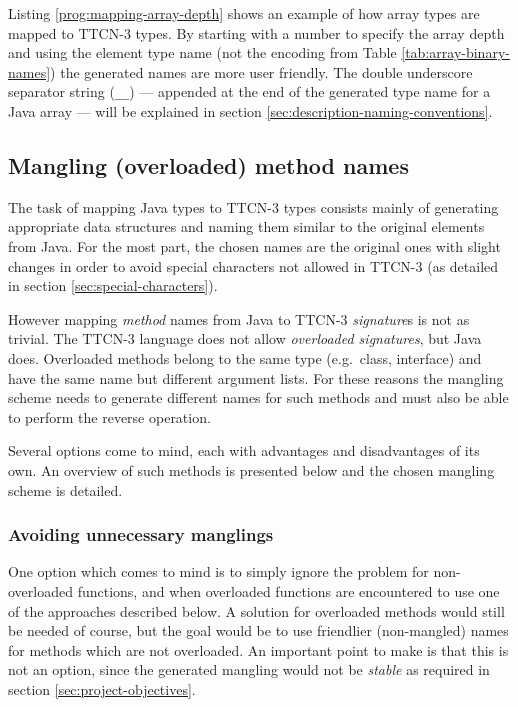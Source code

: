 Listing \ref{prog:mapping-array-depth} shows an example of how
array types are mapped to \ac{TTCN-3} types.
By starting with a number to specify the array depth
and using the element type name
(not the encoding from Table \ref{tab:array-binary-names})
the generated names are more user friendly.
The double underscore separator string (\verb=__=) ---
appended at the end of the generated type name for a Java array ---
will be explained in section \ref{sec:description-naming-conventions}.

\begin{program}
\caption{Mapping of the \texttt{String[][]} Java Array type%
	\label{prog:mapping-array-depth}}
\end{program}


\subsection{Mangling (overloaded) method names}

The task of mapping Java types to \ac{TTCN-3} types
consists mainly of generating appropriate data structures
and naming them similar to the original elements from Java.
For the most part, the chosen names are the original ones
with slight changes in order to avoid special characters
not allowed in \ac{TTCN-3}
(as detailed in section \ref{sec:special-characters}).

However mapping \emph{method} names from Java to
\ac{TTCN-3} \emph{signature}s is not as trivial.
The \ac{TTCN-3} language does not allow \emph{overloaded signatures},
but Java does.
Overloaded methods belong to the same type (e.g.\ class, interface)
and have the same name but different argument lists.
For these reasons the mangling scheme
needs to generate different names for such methods
and must also be able to perform the reverse operation.

Several options come to mind,
each with advantages and disadvantages of its own.
An overview of such methods is presented below
and the chosen mangling scheme is detailed.


\subsubsection{Avoiding unnecessary manglings}
One option which comes to mind is to simply ignore the problem
for non-overloaded functions, and when overloaded functions are encountered
to use one of the approaches described below.
A solution for overloaded methods would still be needed of course,
but the goal would be to use friendlier (non-mangled) names
for methods which are not overloaded.
An important point to make is that this is not an option,
since the generated mangling would not be \emph{stable}
as required in section \ref{sec:project-objectives}.

